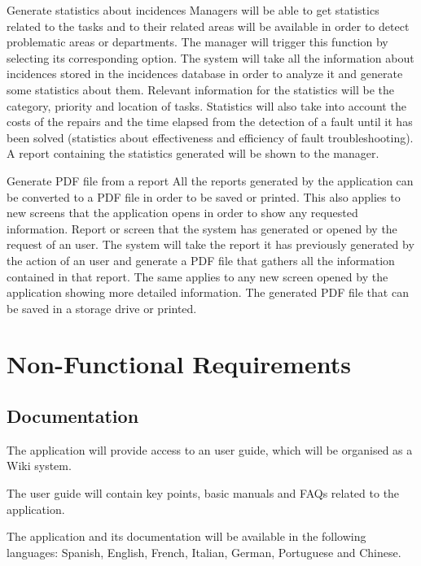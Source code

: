 \begin{requirement}{Generate statistics about incidences}
\reqdesc Managers will be able to get statistics related to the tasks and to their related areas will be available in order to
detect problematic areas or departments.
\reqin The manager will trigger this function by selecting its corresponding option.
\reqsteps The system will take all the information about incidences stored in the incidences database in order to analyze it and generate some statistics about them. Relevant information for the statistics will be the category, priority and location of tasks. Statistics will also take into account the costs of the repairs and the time elapsed from the detection of a fault until it has been solved (statistics about effectiveness and efficiency of fault troubleshooting).
\reqout A report containing the statistics generated will be shown to the manager.
\end{requirement}

\begin{requirement}{Generate PDF file from a report}
\reqdesc All the reports generated by the application can be converted to a PDF file in order to be saved or printed. This also applies to new screens that the application opens in order to show any requested information.
\reqin Report or screen that the system has generated or opened by the request of an user.
\reqsteps The system will take the report it has previously generated by the action of an user and generate a PDF file that gathers all the information contained in that report. The same applies to any new screen opened by the application showing more detailed information.
\reqout The generated PDF file that can be saved in a storage drive or printed.
\end{requirement}


\section{Non-Functional Requirements}

\subsection{Documentation}
\begin{NFrequirement}
The application will provide access to an user guide, which will be organised as a Wiki system. 
\end{NFrequirement}
\begin{NFrequirement}
The user guide will contain key points, basic manuals and FAQs related to the application.
\end{NFrequirement}
\begin{NFrequirement}
The application and its documentation will be available in the following languages: Spanish, English, French, Italian, German, Portuguese and Chinese.
\end{NFrequirement}

